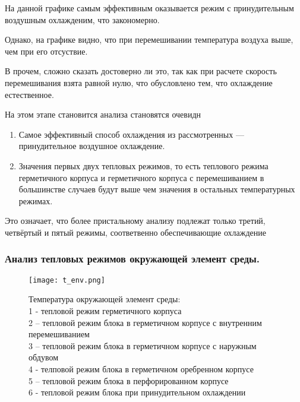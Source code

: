 На данной графике самым эффективным оказывается режим с принудительным
воздушным охлажденим, что закономерно.

Однако, на графике видно, что при перемешивании температура воздуха выше,
чем при его отсуствие.

В прочем, сложно сказать достоверно ли это, так как при расчете
скорость перемешивания взята равной нулю, что обусловлено тем, что
охлаждение естественное.


На этом этапе становится анализа становятся очевидн
\begin{enumerate}[label={\arabic*.}]

\item Самое эффективный способ охлаждения из рассмотренных
  — принудительное воздушное охлаждение.
\item Значения первых двух тепловых режимов, то есть теплового режима
  герметичного корпуса и герметичного корпуса с перемешиванием в
  большинстве случаев будут выше чем значения в остальных температурных режимах.
  
\end{enumerate}

    Это означает, что более пристальному анализу подлежат только
    третий, четвёртый и пятый режимы,
    соответвенно обеспечивающие охлаждение

\subsubsection{ Анализ тепловых режимов окружающей элемент среды.}
\begin{figure}[h] %
\begin{center}
  \texttt{[image: t\_env.png]}
  \end{center}
\caption{Температура окружающей элемент среды:\\
  1 - тепловой режим герметичного корпуса\\
  2 – тепловой режим блока в герметичном корпусе с внутренним перемешиванием\\
  3 – тепловой режим блока в герметичном корпусе с наружным обдувом\\
  4 - телповой режим блока в  герметичном оребренном корпусе \\
  5 – тепловой режим блока в перфорированном корпусе \\
  6 - тепловой режим блока при принудительном охлаждении}

\end{figure}

